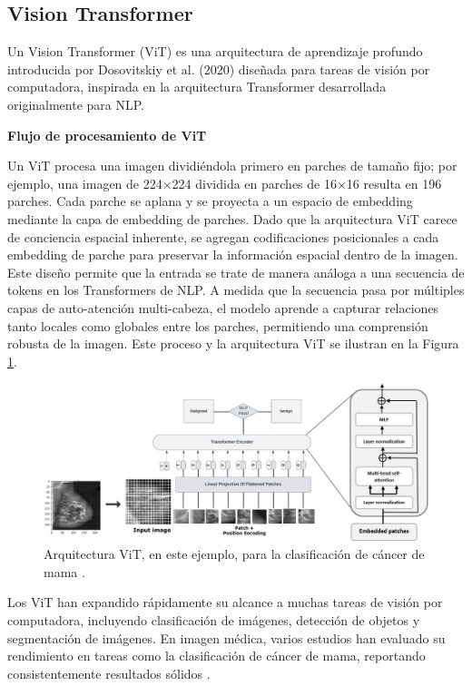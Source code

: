 \documentclass[a4paper,10pt]{book}
\begin{document}
\subsection{Vision Transformer}

Un Vision Transformer (ViT) es una arquitectura de aprendizaje profundo introducida por Dosovitskiy et al. (2020) \cite{dosovitskiy_image_2020} diseñada para tareas de visión por computadora, inspirada en la arquitectura Transformer desarrollada originalmente para NLP.

\textbf{Flujo de procesamiento de ViT}

Un ViT procesa una imagen dividiéndola primero en parches de tamaño fijo; por ejemplo, una imagen de 224×224 dividida en parches de 16×16 resulta en 196 parches. Cada parche se aplana y se proyecta a un espacio de embedding mediante la capa de embedding de parches. Dado que la arquitectura ViT carece de conciencia espacial inherente, se agregan codificaciones posicionales a cada embedding de parche para preservar la información espacial dentro de la imagen. Este diseño permite que la entrada se trate de manera análoga a una secuencia de tokens en los Transformers de NLP. A medida que la secuencia pasa por múltiples capas de auto-atención multi-cabeza, el modelo aprende a capturar relaciones tanto locales como globales entre los parches, permitiendo una comprensión robusta de la imagen. Este proceso y la arquitectura ViT se ilustran en la Figura \ref{fig:vit_arch}.

\begin{figure}[h!]
\centering
\includegraphics[width=1.0\linewidth]{reports//assets/vit_breast.jpg}
\caption[Vision Transformer Architecture]{Arquitectura ViT, en este ejemplo, para la clasificación de cáncer de mama \cite{abimouloud_vision_2024}.}
\label{fig:vit_arch}
\end{figure}

Los ViT han expandido rápidamente su alcance a muchas tareas de visión por computadora, incluyendo clasificación de imágenes, detección de objetos y segmentación de imágenes. En imagen médica, varios estudios han evaluado su rendimiento en tareas como la clasificación de cáncer de mama, reportando consistentemente resultados sólidos \cite{marquez_vara_vision_2024, mauricio_comparing_2023, ayana_vision-transformer-based_2023}.
\end{document}
